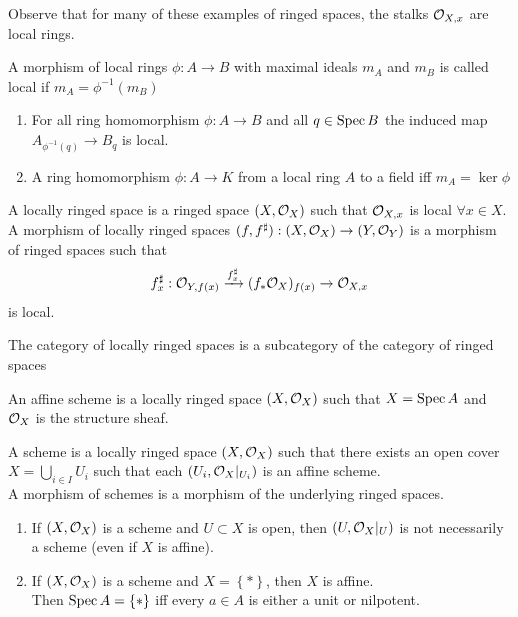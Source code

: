 \documentclass[../main.tex]{subfiles}
\begin{document}
Observe that for many of these examples of ringed spaces, the stalks $\mathcal{O}_{X,x} $ are local rings.
\begin{defn}
	A morphism of local rings $\phi:A\to B$ with maximal ideals $m_A$ and $m_B$ is called local if $m_A= \phi^{-1}( m_B) $ 
\end{defn}
\begin{exemple}
\begin{enumerate}
\item For all ring homomorphism $\phi: A\to B$ and all $q\in \operatorname{Spec} B$ the induced map $A_{\phi^{-1}( q) } \to B_q$ is local.
\item A ring homomorphism $\phi: A\to K$ from a local ring $A$ to a field iff $m_A= \ker\phi$ 
\end{enumerate}
\end{exemple}
\begin{defn}
	A locally ringed space is a ringed space $ ( X,\mathcal{O}_X) $ such that $\mathcal{O}_{X,x} $ is local $\forall x\in X$.\\
	A morphism of locally ringed spaces $( f,f^{\sharp}) : ( X,\mathcal{O}_X) \to ( Y,\mathcal{O}_Y) $  is a morphism of ringed spaces such that 
	\[ 
		f_x^{\sharp}: \mathcal{O}_{Y,f( x) } \xrightarrow{f^{\sharp}_x} ( f_{\ast} \mathcal{O}_X)_{f( x) } \to \mathcal{O}_{X,x} 
	\]
	is local.
\end{defn}
\begin{rmq}
The category of locally ringed spaces is a subcategory of the category of ringed spaces
\end{rmq}
\begin{defn}
	An affine scheme is a locally ringed space $( X,\mathcal{O}_X) $ such that $X= \operatorname{Spec} A$ and $\mathcal{O}_X$ is the structure sheaf.
\end{defn}
\begin{defn}[Scheme]
	A scheme is a locally ringed space $( X,\mathcal{O}_X) $ such that there exists an open cover $X= \bigcup_{i \in I} U_i$ such that each $( U_i, \mathcal{O}_X|_{U_i} ) $ is an affine scheme.\\
	A morphism of schemes is a morphism of the underlying ringed spaces.
\end{defn}
\begin{exemple}
\begin{enumerate}
\item If $( X,\mathcal{O}_X) $ is a scheme and $U \subset X$ is open, then $( U,\mathcal{O}_X|_U) $ is not necessarily a scheme (even if $X$ is affine).
\item If $( X,\mathcal{O}_X) $ is a scheme and $X= \left\{ \ast \right\} $, then $X$ is affine.\\
Then $\operatorname{Spec} A = \left\{ \ast \right\} $ iff every $a\in A$ is either a unit or nilpotent.
\end{enumerate}

\end{exemple}



		
\end{document}
